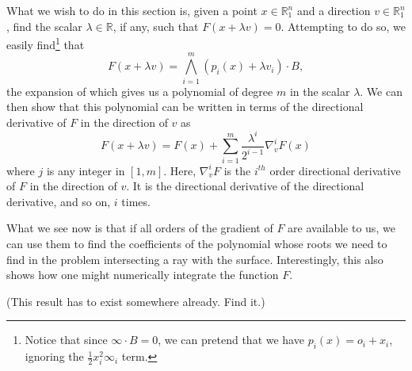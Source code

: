 \documentclass{birkjour}
\theoremstyle{definition}
\theoremstyle{remark}
\numberwithin{equation}{section}
\newcommand{\R}{\mathbb{R}}
\newcommand{\nvai}{\infty}
\newcommand{\nvao}{o}
\begin{document}
What we wish to do in this section is, given a point $x\in\R_1^n$ and a
direction $v\in\R_1^n$, find the scalar $\lambda\in\R$, if any, such that
$F(x+\lambda v)=0$.  Attempting to do so, we easily find\footnote{Notice that
since $\nvai\cdot B=0$, we can pretend that we have $p_i(x)=\nvao_i+x_i$,
ignoring the $\frac{1}{2}x_i^2\nvai_i$ term.} that
\begin{equation*}
F(x+\lambda v) = \bigwedge_{i=1}^m (p_i(x)+\lambda v_i)\cdot B,
\end{equation*}
the expansion of which gives us a polynomial of degree $m$ in the scalar $\lambda$.
We can then show that this polynomial can be written in terms of the directional derivative of $F$
in the direction of $v$ as
\begin{equation*}
F(x+\lambda v) = F(x) + \sum_{i=1}^m \frac{\lambda^i}{2^{i-1}}\nabla_v^i F(x)
\end{equation*}
where $j$ is any integer in $[1,m]$.
Here, $\nabla_v^i F$ is the $i^{th}$ order directional derivative of $F$ in the direction of $v$.
It is the directional derivative of the directional derivative, and so on, $i$ times.

What we see now is that if all orders of the gradient of $F$ are available to us,
we can use them to find the coefficients of the polynomial whose roots we need
to find in the problem intersecting a ray with the surface.  Interestingly, this
also shows how one might numerically integrate the function $F$.

(This result has to exist somewhere already.  Find it.)
\end{document}
